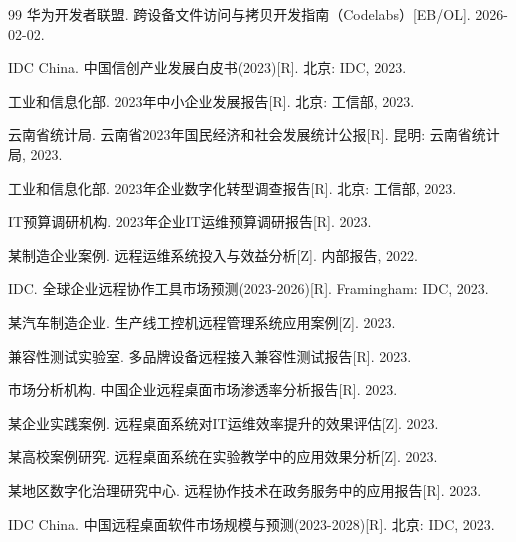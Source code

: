 \documentclass[12pt,a4paper]{article}
\begin{document}
\begin{thebibliography}{99}
华为开发者联盟. 跨设备文件访问与拷贝开发指南（Codelabs）[EB/OL]. 2026-02-02.

IDC China. 中国信创产业发展白皮书(2023)[R]. 北京: IDC, 2023.

工业和信息化部. 2023年中小企业发展报告[R]. 北京: 工信部, 2023.

云南省统计局. 云南省2023年国民经济和社会发展统计公报[R]. 昆明: 云南省统计局, 2023.

工业和信息化部. 2023年企业数字化转型调查报告[R]. 北京: 工信部, 2023.

IT预算调研机构. 2023年企业IT运维预算调研报告[R]. 2023.

某制造企业案例. 远程运维系统投入与效益分析[Z]. 内部报告, 2022.

IDC. 全球企业远程协作工具市场预测(2023-2026)[R]. Framingham: IDC, 2023.

某汽车制造企业. 生产线工控机远程管理系统应用案例[Z]. 2023.

兼容性测试实验室. 多品牌设备远程接入兼容性测试报告[R]. 2023.

市场分析机构. 中国企业远程桌面市场渗透率分析报告[R]. 2023.

某企业实践案例. 远程桌面系统对IT运维效率提升的效果评估[Z]. 2023.

某高校案例研究. 远程桌面系统在实验教学中的应用效果分析[Z]. 2023.

某地区数字化治理研究中心. 远程协作技术在政务服务中的应用报告[R]. 2023.

IDC China. 中国远程桌面软件市场规模与预测(2023-2028)[R]. 北京: IDC, 2023.


\end{thebibliography}
\end{document}
